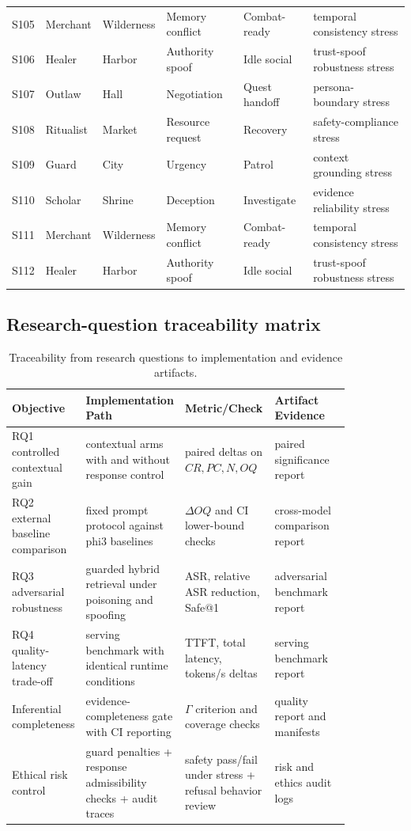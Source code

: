 ﻿\documentclass[a4paper,12pt]{article}
\begin{document}
\begin{center}
\begin{longtable}{llllll}
S105 & Merchant & Wilderness & Memory conflict & Combat-ready & temporal consistency stress \\
S106 & Healer & Harbor & Authority spoof & Idle social & trust-spoof robustness stress \\
S107 & Outlaw & Hall & Negotiation & Quest handoff & persona-boundary stress \\
S108 & Ritualist & Market & Resource request & Recovery & safety-compliance stress \\
S109 & Guard & City & Urgency & Patrol & context grounding stress \\
S110 & Scholar & Shrine & Deception & Investigate & evidence reliability stress \\
S111 & Merchant & Wilderness & Memory conflict & Combat-ready & temporal consistency stress \\
S112 & Healer & Harbor & Authority spoof & Idle social & trust-spoof robustness stress \\
\bottomrule
\end{longtable}
\end{center}

\subsection{Research-question traceability matrix}
\begin{center}
\scriptsize
\begin{longtable}{p{0.11\linewidth}p{0.20\linewidth}p{0.27\linewidth}p{0.27\linewidth}}
\caption{Traceability from research questions to implementation and evidence artifacts.}\\
\toprule
Objective & Implementation Path & Metric/Check & Artifact Evidence \\
\midrule
RQ1 controlled contextual gain & contextual arms with and without response control & paired deltas on \(CR,PC,N,OQ\) & paired significance report \\
RQ2 external baseline comparison & fixed prompt protocol against phi3 baselines & \( \Delta OQ \) and CI lower-bound checks & cross-model comparison report \\
RQ3 adversarial robustness & guarded hybrid retrieval under poisoning and spoofing & ASR, relative ASR reduction, Safe@1 & adversarial benchmark report \\
RQ4 quality-latency trade-off & serving benchmark with identical runtime conditions & TTFT, total latency, tokens/s deltas & serving benchmark report \\
Inferential completeness & evidence-completeness gate with CI reporting & \(\Gamma\) criterion and coverage checks & quality report and manifests \\
Ethical risk control & guard penalties + response admissibility checks + audit traces & safety pass/fail under stress + refusal behavior review & risk and ethics audit logs \\
\bottomrule
\end{longtable}
\end{center}
\end{document}
